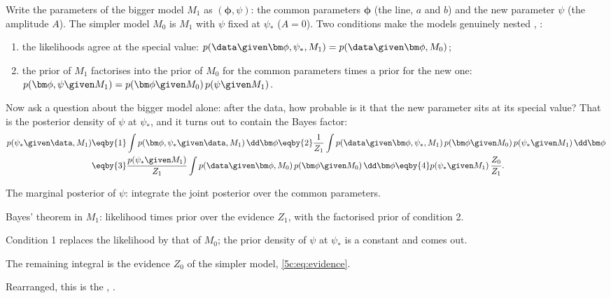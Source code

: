 Write the parameters of the bigger model $M_1$ as $(\bm\phi,\psi)$: the common
parameters $\bm\phi$ (the line, $a$ and $b$) and the new parameter $\psi$ (the
amplitude $A$). The simpler model $M_0$ is $M_1$ with $\psi$ fixed at $\psi_*$ ($A=0$).
Two conditions make the models genuinely nested ,
\cite[eq.~(22)]{Trotta2008}:
\begin{enumerate}[itemsep=1pt,leftmargin=1.6em]
  \item the likelihoods agree at the special value:
        $p(\data\given\bm\phi,\psi_*,M_1)=p(\data\given\bm\phi,M_0)$;
  \item the prior of $M_1$ factorises into the prior of $M_0$ for the common
        parameters times a prior for the new one:
        $p(\bm\phi,\psi\given M_1)=p(\bm\phi\given M_0)\,p(\psi\given M_1)$.
\end{enumerate}
Now ask a question about the bigger model alone: after the data, how probable is it
that the new parameter sits at its special value? That is the posterior density of
$\psi$ at $\psi_*$, and it turns out to contain the Bayes factor:
\begin{align}
  p(\psi_*\given\data,M_1)
  &\eqby{1}\int p(\bm\phi,\psi_*\given\data,M_1)\,\dd\bm\phi
   \eqby{2}\frac{1}{Z_1}\int p(\data\given\bm\phi,\psi_*,M_1)\,
      p(\bm\phi\given M_0)\,p(\psi_*\given M_1)\,\dd\bm\phi \nonumber\\
  &\eqby{3}\frac{p(\psi_*\given M_1)}{Z_1}\int p(\data\given\bm\phi,M_0)\,
      p(\bm\phi\given M_0)\,\dd\bm\phi
   \eqby{4}p(\psi_*\given M_1)\,\frac{Z_0}{Z_1} .
  \label{5c:eq:sddr-derivation}
\end{align}
\begin{explain}
  \item The marginal posterior of $\psi$: integrate the joint posterior over the common
        parameters.
  \item Bayes' theorem in $M_1$: likelihood times prior over the evidence $Z_1$, with the
        factorised prior of condition 2.
  \item Condition 1 replaces the likelihood by that of $M_0$; the prior density of
        $\psi$ at $\psi_*$ is a constant and comes out.
  \item The remaining integral is the evidence $Z_0$ of the simpler model,
        \eqref{5c:eq:evidence}.
\end{explain}
Rearranged, this is the 
, \cite[eq.~(23)]{Trotta2008}.

